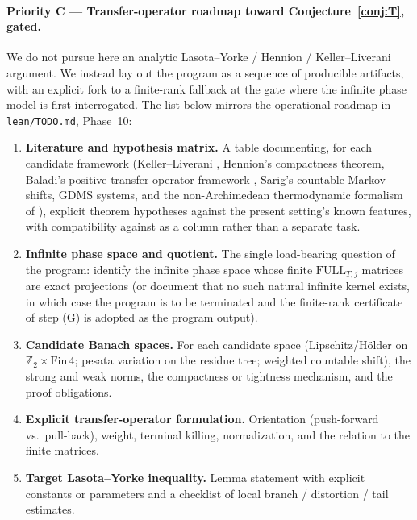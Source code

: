 \documentclass[11pt,a4paper]{article}
\theoremstyle{definition}
\newcommand{\Zp}{\mathbb{Z}_2}
\newcommand{\full}{\mathrm{FULL}}
\begin{document}
\paragraph{Priority C --- Transfer-operator roadmap toward
Conjecture~\ref{conj:T}, gated.}
We do not pursue here an analytic Lasota--Yorke / Hennion /
Keller--Liverani argument. We instead lay out the program as a
sequence of producible artifacts, with an explicit fork to a
finite-rank fallback at the gate where the infinite phase model
is first interrogated. The list below mirrors the operational
roadmap in \texttt{lean/TODO.md}, Phase~10:
\begin{enumerate}
  \item \textbf{Literature and hypothesis matrix.} A table
        documenting, for each candidate framework
        (Keller--Liverani \cite{kellerliverani}, Hennion's
        compactness theorem, Baladi's positive transfer
        operator framework \cite{baladi}, Sarig's countable
        Markov shifts, GDMS systems, and the non-Archimedean
        thermodynamic formalism of \cite{anashin,bcm2020}),
        explicit theorem hypotheses against the present
        setting's known features, with compatibility against
        \cite[\S 7, Remark~9.17]{chang2026} as a column rather
        than a separate task.
  \item \textbf{Infinite phase space and quotient.} The single
        load-bearing question of the program: identify the
        infinite phase space whose finite
        $\full_{T, j}$ matrices are exact projections (or
        document that no such natural infinite kernel exists,
        in which case the program is to be terminated and the
        finite-rank certificate of step (G) is adopted as the
        program output).
  \item \textbf{Candidate Banach spaces.} For each candidate
        space (Lipschitz/H\"older on
        $\Zp \times \mathrm{Fin}\,4$; pesata variation on the
        residue tree; weighted countable shift), the strong
        and weak norms, the compactness or tightness
        mechanism, and the proof obligations.
  \item \textbf{Explicit transfer-operator formulation.}
        Orientation (push-forward vs.\ pull-back), weight,
        terminal killing, normalization, and the relation to
        the finite matrices.
  \item \textbf{Target Lasota--Yorke inequality.} Lemma
        statement with explicit constants or parameters and a
        checklist of local branch / distortion / tail estimates.

\end{enumerate}
\end{document}
